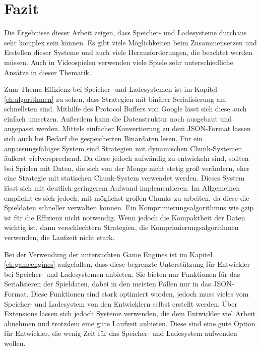\chapter{Fazit}\label{ch:fazit}
Die Ergebnisse dieser Arbeit zeigen, dass Speicher- und Ladesysteme durchaus sehr komplex sein können. Es gibt viele Möglichkeiten beim Zusammensetzen und Erstellen dieser Systeme und auch viele Herausforderungen, die beachtet werden müssen. Auch in Videospielen verwenden viele Spiele sehr unterschiedliche Ansätze in dieser Thematik. 

Zum Thema Effizienz bei Speicher- und Ladesystemen ist im Kapitel \ref{ch:algorithmen} zu sehen, dass Strategien mit binärer Serialisierung am schnellsten sind. Mithilfe des Protocol Buffers von Google lässt sich diese auch einfach umsetzen. Außerdem kann die Datenstruktur noch ausgebaut und angepasst werden. Mittels einfacher Konvertierung zu dem JSON-Format lassen sich auch bei Bedarf die gespeicherten Binärdaten lesen. Für ein anpassungsfähiges System sind Strategien mit dynamischen Chunk-Systemen äußerst vielversprechend. Da diese jedoch aufwändig zu entwickeln sind, sollten bei Spielen mit Daten, die sich von der Menge nicht stetig groß verändern, eher eine Strategie mit statischen Chunk-System verwendet werden. Dieses System lässt sich mit deutlich geringerem Aufwand implementieren. Im Allgemeinen empfiehlt es sich jedoch, mit möglichst großen Chunks zu arbeiten, da diese die Spieldaten schneller verwalten können. Ein Komprimierungsalgorithmus wie \ac{gzip} ist für die Effizienz nicht notwendig. Wenn jedoch die Kompaktheit der Daten wichtig ist, dann verschlechtern Strategien, die Komprimierungsalgorithmen verwenden, die Laufzeit nicht stark. 

Bei der Verwendung der untersuchten Game Engines ist im Kapitel \ref{ch:gameengines} aufgefallen, dass diese begrenzte Unterstützung für Entwickler bei Speicher- und Ladesystemen anbieten. Sie bieten nur Funktionen für das Serialisieren der Spieldaten, dabei in den meisten Fällen nur in das JSON-Format. Diese Funktionen sind stark optimiert worden, jedoch muss vieles vom Speicher- und Ladesystem von den Entwicklern selbst erstellt werden. Über Extensions lassen sich jedoch Systeme verwenden, die dem Entwickler viel Arbeit abnehmen und trotzdem eine gute Laufzeit anbieten. Diese sind eine gute Option für Entwickler, die wenig Zeit für das Speicher- und Ladesystem aufwenden wollen.

